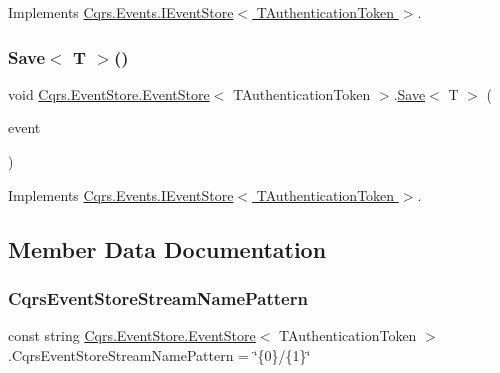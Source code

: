 Implements \hyperlink{interfaceCqrs_1_1Events_1_1IEventStore_a81fb586703e7c6dea6b23d9a95f3887a}{Cqrs.\+Events.\+I\+Event\+Store$<$ T\+Authentication\+Token $>$}.

\mbox{\label{classCqrs_1_1EventStore_1_1EventStore_a7261e5b74f55ef7afd23144c155ba116}} 
\subsubsection{\texorpdfstring{Save$<$ T $>$()}{Save< T >()}}
{\footnotesize\ttfamily void \hyperlink{classCqrs_1_1EventStore_1_1EventStore}{Cqrs.\+Event\+Store.\+Event\+Store}$<$ T\+Authentication\+Token $>$.\hyperlink{classCqrs_1_1EventStore_1_1EventStore_adce33037e2a3eb81cfccded42ba2ed35}{Save}$<$ T $>$ (\begin{DoxyParamCaption}\item[{\hyperlink{interfaceCqrs_1_1Events_1_1IEvent}{I\+Event}$<$ T\+Authentication\+Token $>$ @}]{event }\end{DoxyParamCaption})}



Implements \hyperlink{interfaceCqrs_1_1Events_1_1IEventStore_a92e768243d6602d09b786bbd06811ce6}{Cqrs.\+Events.\+I\+Event\+Store$<$ T\+Authentication\+Token $>$}.



\subsection{Member Data Documentation}
\mbox{\label{classCqrs_1_1EventStore_1_1EventStore_ae9733f8511daf86ae3dac78bcbc5b2f0}} 
\subsubsection{\texorpdfstring{Cqrs\+Event\+Store\+Stream\+Name\+Pattern}{CqrsEventStoreStreamNamePattern}}
{\footnotesize\ttfamily const string \hyperlink{classCqrs_1_1EventStore_1_1EventStore}{Cqrs.\+Event\+Store.\+Event\+Store}$<$ T\+Authentication\+Token $>$.Cqrs\+Event\+Store\+Stream\+Name\+Pattern = \char`\"{}\{0\}/\{1\}\char`\"{}\hspace{0.3cm}{\ttfamily [protected]}}



